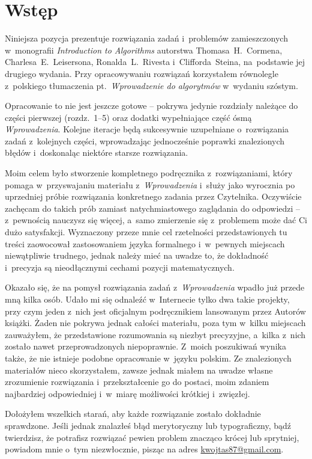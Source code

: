 \chapter{Wstęp}

Niniejsza pozycja prezentuje rozwiązania zadań i~problemów zamieszczonych w~monografii \textsl{Introduction to Algorithms} \cite{cormen} autorstwa Thomasa~H.~Cormena, Charlesa~E.~Leisersona, Ronalda~L.~Rivesta i~Clifforda~Steina, na~podstawie jej drugiego wydania. Przy opracowywaniu rozwiązań korzystałem równolegle z~polskiego tłumaczenia pt.~\textsl{Wprowadzenie do algorytmów} \cite{cormenpl} w~wydaniu szóstym.

Opracowanie to nie jest jeszcze gotowe -- pokrywa jedynie rozdziały należące do części pierwszej (rozdz.~1\nobreakdash--5) oraz dodatki wypełniające część ósmą \textsl{Wprowadzenia}. Kolejne iteracje będą sukcesywnie uzupełniane o~rozwiązania zadań z~kolejnych części, wprowadzając jednocześnie poprawki znalezionych błędów i~doskonaląc niektóre starsze rozwiązania.

Moim celem było stworzenie kompletnego podręcznika z~rozwiązaniami, który pomaga w~przyswajaniu materiału z~\textsl{Wprowadzenia} i~służy jako wyrocznia po uprzedniej próbie rozwiązania konkretnego zadania przez Czytelnika. Oczywiście zachęcam do takich prób zamiast natychmiastowego zaglądania do odpowiedzi -- z~pewnością nauczysz się więcej, a~samo zmierzenie się z~problemem może dać Ci dużo satysfakcji. Wyznaczony przeze mnie cel rzetelności przedstawionych tu treści zaowocował zastosowaniem języka formalnego i~w~pewnych miejscach niewątpliwie trudnego, jednak należy mieć na uwadze to, że dokładność i~precyzja są nieodłącznymi cechami pozycji matematycznych.

Okazało się, że na pomysł rozwiązania zadań z~\textsl{Wprowadzenia} wpadło już przede mną kilka osób. Udało mi się odnaleźć w~Internecie tylko dwa takie projekty, przy czym jeden z~nich jest oficjalnym podręcznikiem lansowanym przez Autorów książki. Żaden nie pokrywa jednak całości materiału, poza tym w~kilku miejscach zauważyłem, że przedstawione rozumowania są niezbyt precyzyjne, a~kilka z~nich zostało nawet przeprowadzonych niepoprawnie. Z~moich poszukiwań wynika także, że nie istnieje podobne opracowanie w~języku polskim. Ze znalezionych materiałów nieco skorzystałem, zawsze jednak miałem na uwadze własne zrozumienie rozwiązania i~przekształcenie go do postaci, moim zdaniem najbardziej odpowiedniej i~w~miarę możliwości krótkiej i~zwięzłej.

Dołożyłem wszelkich starań, aby każde rozwiązanie zostało dokładnie sprawdzone. Jeśli jednak znalazłeś błąd merytoryczny lub typograficzny, bądź twierdzisz, że potrafisz rozwiązać pewien problem znacząco krócej lub sprytniej, powiadom mnie o~tym niezwłocznie, pisząc na adres \url{kwojtas87@gmail.com}.

